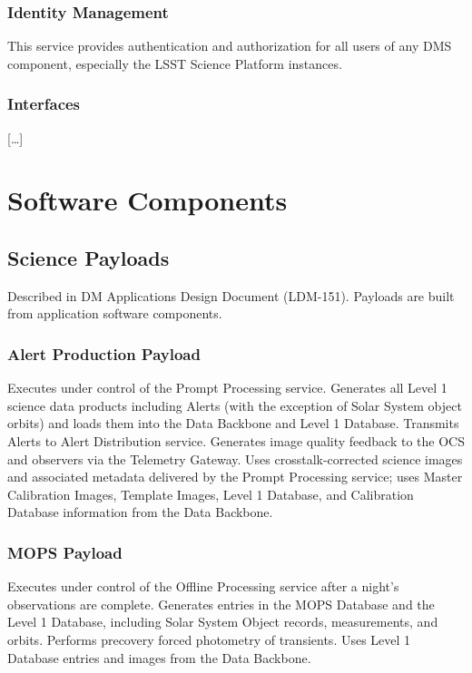 \documentclass[]{article}
\begin{document}
\subsubsection{Identity Management}\label{identity-management}

This service provides authentication and authorization for all users of
any DMS component, especially the LSST Science Platform instances.

\subsubsection{Interfaces}\label{interfaces-5}

{[}\ldots{}{]}

\section{Software Components}\label{software-components}

\subsection{Science Payloads}\label{science-payloads}

Described in DM Applications Design Document (LDM-151). Payloads are
built from application software components.

\subsubsection{Alert Production Payload}\label{alert-production-payload}

Executes under control of the Prompt Processing service. Generates all
Level 1 science data products including Alerts (with the exception of
Solar System object orbits) and loads them into the Data Backbone and
Level 1 Database. Transmits Alerts to Alert Distribution service.
Generates image quality feedback to the OCS and observers via the
Telemetry Gateway. Uses crosstalk-corrected science images and
associated metadata delivered by the Prompt Processing service; uses
Master Calibration Images, Template Images, Level 1 Database, and
Calibration Database information from the Data Backbone.

\subsubsection{MOPS Payload}\label{mops-payload}

Executes under control of the Offline Processing service after a night's
observations are complete. Generates entries in the MOPS Database and
the Level 1 Database, including Solar System Object records,
measurements, and orbits. Performs precovery forced photometry of
transients. Uses Level 1 Database entries and images from the Data
Backbone.
\end{document}
